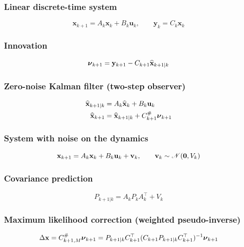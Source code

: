 \subsubsection{Linear discrete-time system}
\begin{equation*}
    \mathbf x_{k+1}=A_k\mathbf x_k+B_k\mathbf u_k,\qquad\mathbf y_k=C_k\mathbf x_k
\end{equation*}

\subsubsection{Innovation}
\begin{equation*}
    {\boldsymbol{\nu}}_{k+1}=\mathbf y_{k+1}-C_{k+1}\widehat{\mathbf x}_{k+1|k}
\end{equation*}

\subsubsection{Zero-noise Kalman filter (two-step observer)}
\begin{align*}
    \widehat{\mathbf x}_{k+1|k}&=A_k\widehat{\mathbf x}_k+B_k\mathbf u_k\\
    \widehat{\mathbf x}_{k+1}&=\widehat{\mathbf x}_{k+1|k}+C_{k+1}^\#{\boldsymbol{\nu}}_{k+1}
\end{align*}

\subsubsection{System with noise on the dynamics}
\begin{equation*}
    \mathbf x_{k+1}=A_k\mathbf x_k+B_k\mathbf u_k+\mathbf v_k,\qquad\mathbf v_k\sim\mathscr{N}(\mathbf 0,V_k)
\end{equation*}

\subsubsection{Covariance prediction}
\begin{equation*}
    P_{k+1|k}=A_kP_kA_k^\top+V_k
\end{equation*}

\subsubsection{Maximum likelihood correction (weighted pseudo-inverse)}
\begin{equation*}
    \Delta\mathbf x=C_{k+1,M}^\#{\boldsymbol{\nu}}_{k+1}=P_{k+1|k}C_{k+1}^\top(C_{k+1}P_{k+1|k}C_{k+1}^\top)^{-1}{\boldsymbol{\nu}}_{k+1}
\end{equation*}

